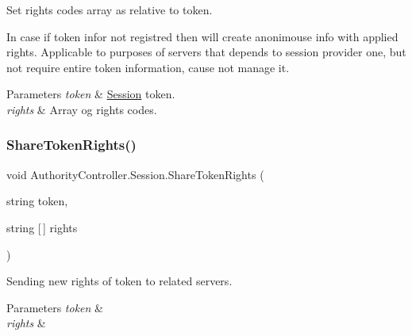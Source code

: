 Set rights\textquotesingle{} codes array as relative to token. 

In case if token infor not registred then will create anonimouse info with applied rights. Applicable to purposes of servers that depends to session provider one, but not require entire token information, cause not manage it. 


\begin{DoxyParams}{Parameters}
{\em token} & \mbox{\hyperlink{class_authority_controller_1_1_session}{Session}} token.\\
\hline
{\em rights} & Array og rights\textquotesingle{} codes.\\
\hline
\end{DoxyParams}
\mbox{\label{class_authority_controller_1_1_session_ae8e875b83d01b42f4623d2c81841ce62}} 
\subsubsection{\texorpdfstring{Share\+Token\+Rights()}{ShareTokenRights()}}
{\footnotesize\ttfamily void Authority\+Controller.\+Session.\+Share\+Token\+Rights (\begin{DoxyParamCaption}\item[{string}]{token,  }\item[{string \mbox{[}$\,$\mbox{]}}]{rights }\end{DoxyParamCaption})\hspace{0.3cm}{\ttfamily [private]}}



Sending new rights of token to related servers. 


\begin{DoxyParams}{Parameters}
{\em token} & \\
\hline
{\em rights} & \\
\hline
\end{DoxyParams}
\mbox{\label{class_authority_controller_1_1_session_abdd6c48f989b28cc9b3838dbe569edc6}} 

